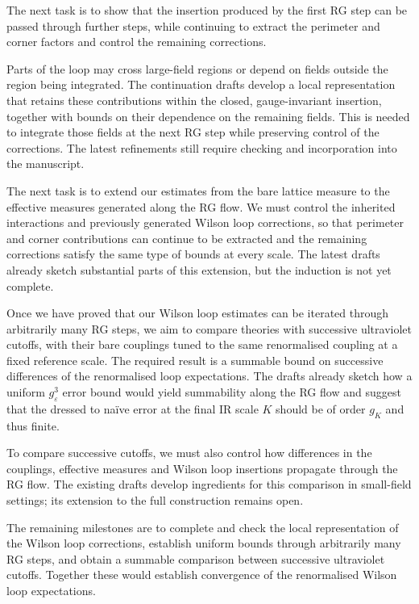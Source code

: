 \documentclass[10pt,a4paper]{article}
\newcommand{\subhead}[1]{\par\vspace{5pt}{\large\bfseries\color{ink}#1\par}\vspace{3pt}}
\begin{document}
The next task is to show that the insertion produced by the first RG step can be passed through further steps, while continuing to extract the perimeter and corner factors and control the remaining corrections.

Parts of the loop may cross large-field regions or depend on fields outside the region being integrated. The continuation drafts develop a local representation that retains these contributions within the closed, gauge-invariant insertion, together with bounds on their dependence on the remaining fields. This is needed to integrate those fields at the next RG step while preserving control of the corrections. The latest refinements still require checking and incorporation into the manuscript.

The next task is to extend our estimates from the bare lattice measure to the effective measures generated along the RG flow. We must control the inherited interactions and previously generated Wilson loop corrections, so that perimeter and corner contributions can continue to be extracted and the remaining corrections satisfy the same type of bounds at every scale. The latest drafts already sketch substantial parts of this extension, but the induction is not yet complete.

\subhead{From an Induction to an Ultraviolet Limit}

Once we have proved that our Wilson loop estimates can be iterated through arbitrarily many RG steps, we aim to compare theories with successive ultraviolet cutoffs, with their bare couplings tuned to the same renormalised coupling at a fixed reference scale. The required result is a summable bound on successive differences of the renormalised loop expectations. The drafts already sketch how a uniform $g_\varepsilon^3$ error bound would yield summability along the RG flow and suggest that the dressed to na{\"i}ve error at the final IR scale $K$ should be of order $g_K$ and thus finite.

To compare successive cutoffs, we must also control how differences in the couplings, effective measures and Wilson loop insertions propagate through the RG flow. The existing drafts develop ingredients for this comparison in small-field settings; its extension to the full construction remains open.

The remaining milestones are to complete and check the local representation of the Wilson loop corrections, establish uniform bounds through arbitrarily many RG steps, and obtain a summable comparison between successive ultraviolet cutoffs. Together these would establish convergence of the renormalised Wilson loop expectations.
\end{document}
